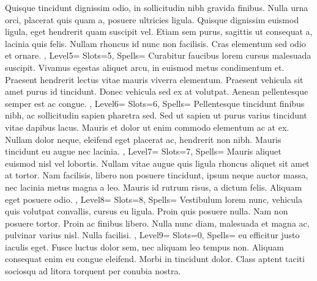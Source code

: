 \documentclass[10pt,a4paper]{scrbook}
\begin{document}
{{{				Quisque tincidunt dignissim odio, 
				in sollicitudin nibh gravida finibus. 
				Nulla urna orci, placerat quis quam a, 
				posuere ultricies ligula. 
				Quisque dignissim euismod ligula, 
				eget hendrerit quam suscipit vel. 
				Etiam sem purus, sagittis ut consequat a,
				lacinia quis felis. 
				Nullam rhoncus id nunc non facilisis. 
				Cras elementum sed odio et ornare. 
			}
		},
		Level5={
			Slots=5,
			Spells={
				Curabitur faucibus lorem cursus malesuada suscipit. 
				Vivamus egestas aliquet arcu, 
				in euismod metus condimentum et. 
				Praesent hendrerit lectus vitae mauris viverra elementum. 
				Praesent vehicula sit amet purus id tincidunt. 
				Donec vehicula sed ex at volutpat. 
				Aenean pellentesque semper est ac congue. 
			}
		},
		Level6={
			Slots=6,
			Spells={
				Pellentesque tincidunt finibus nibh, 
				ac sollicitudin sapien pharetra sed. 
				Sed ut sapien ut purus varius tincidunt vitae dapibus lacus. 
				Mauris et dolor ut enim commodo elementum ac at ex. 
				Nullam dolor neque, eleifend eget placerat ac, 
				hendrerit non nibh. 
				Mauris tincidunt eu augue nec lacinia. 
			}
		},
		Level7={
			Slots=7,
			Spells={
				Mauris aliquet euismod nisl vel lobortis. 
				Nullam vitae augue quis ligula rhoncus aliquet sit amet at tortor. 
				Nam facilisis, libero non posuere tincidunt, 
				ipsum neque auctor massa, nec lacinia metus magna a leo. 
				Mauris id rutrum risus, a dictum felis. 
				Aliquam eget posuere odio. 
			}
		},
		Level8={
			Slots=8,
			Spells={
				Vestibulum lorem nunc, vehicula quis volutpat convallis, 
				cursus eu ligula. Proin quis posuere nulla. 
				Nam non posuere tortor. 
				Proin ac finibus libero. 
				Nulla nunc diam, malesuada et magna ac, 
				pulvinar varius nisl. 
				Nulla facilisi. 
			}
		},
		Level9={
			Slots=0,
			Spells={
				eu efficitur justo iaculis eget. 
				Fusce luctus dolor sem, nec aliquam leo tempus non. 
				Aliquam consequat enim eu congue eleifend. 
				Morbi in tincidunt dolor. 
				Class aptent taciti sociosqu ad litora torquent 
				per conubia nostra. 
			}
		}
	}
\end{document}

